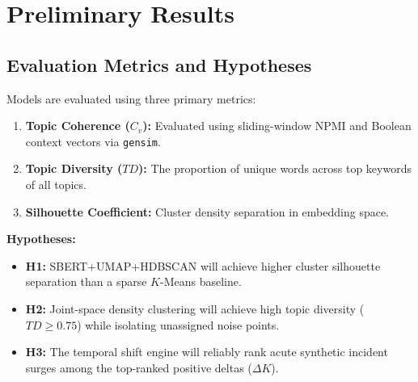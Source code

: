 \documentclass[11pt]{article}
\begin{document}
\section{Preliminary Results}

\begin{table}[H]
\centering
\small
{}
\caption{Preliminary benchmark comparison on incident corpus.}
\label{tab:prelim_results}
\end{table}

\subsection{Evaluation Metrics and Hypotheses}
Models are evaluated using three primary metrics:
\begin{enumerate}
    \item \textbf{Topic Coherence ($C_v$):} Evaluated using sliding-window NPMI and Boolean context vectors \citep{roder2015exploring} via \texttt{gensim}.
    \item \textbf{Topic Diversity ($TD$):} The proportion of unique words across top keywords of all topics.
    \item \textbf{Silhouette Coefficient:} Cluster density separation in embedding space.
\end{enumerate}

\noindent \textbf{Hypotheses:}
\begin{itemize}
    \item \textbf{H1:} SBERT+UMAP+HDBSCAN will achieve higher cluster silhouette separation than a sparse $K$-Means baseline.
    \item \textbf{H2:} Joint-space density clustering will achieve high topic diversity ($TD \ge 0.75$) while isolating unassigned noise points.
    \item \textbf{H3:} The temporal shift engine will reliably rank acute synthetic incident surges among the top-ranked positive deltas ($\Delta K$).
\end{itemize}
\end{document}
